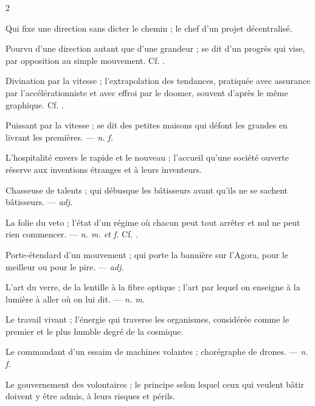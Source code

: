 \begin{multicols}{2}

 Qui fixe une direction sans dicter le chemin ; le chef d'un projet décentralisé.

 Pourvu d'une direction autant que d'une grandeur ; se dit d'un progrès qui vise, par opposition au simple mouvement. Cf. .

 Divination par la vitesse ; l'extrapolation des tendances, pratiquée avec assurance par l'accélérationniste et avec effroi par le doomer, souvent d'après le même graphique. Cf. .

 Puissant par la vitesse ; se dit des petites maisons qui défont les grandes en livrant les premières. —  \textit{n. f.}

 L'hospitalité envers le rapide et le nouveau ; l'accueil qu'une société ouverte réserve aux inventions étranges et à leurs inventeurs.

 Chasseuse de talents ; qui débusque les bâtisseurs avant qu'ils ne se sachent bâtisseurs. —  \textit{adj.}

 La folie du veto ; l'état d'un régime où chacun peut tout arrêter et nul ne peut rien commencer. —  \textit{n. m. et f.} Cf. .

 Porte-étendard d'un mouvement ; qui porte la bannière sur l'Agora, pour le meilleur ou pour le pire. —  \textit{adj.}

 L'art du verre, de la lentille à la fibre optique ; l'art par lequel on enseigne à la lumière à aller où on lui dit. —  \textit{n. m.}

 Le travail vivant ; l'énergie qui traverse les organismes, considérée comme le premier et le plus humble degré de la  cosmique.

 Le commandant d'un essaim de machines volantes ; chorégraphe de drones. —  \textit{n. f.}

 Le gouvernement des volontaires ; le principe selon lequel ceux qui veulent bâtir doivent y être admis, à leurs risques et périls.

\end{multicols}

